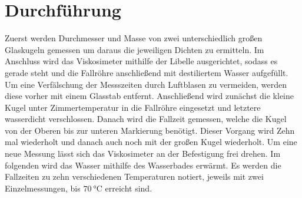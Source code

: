 
\section{Durchführung}
\label{sec:Durchführung}
Zuerst werden Durchmesser und Masse von zwei unterschiedlich großen Glaskugeln
gemessen um daraus die jeweiligen Dichten zu ermitteln. Im Anschluss wird das
Viskosimeter mithilfe der Libelle ausgerichtet, sodass es gerade steht und die Fallröhre anschließend
mit destiliertem Wasser aufgefüllt. Um eine Verfälschung der Messszeiten durch
Luftblasen zu vermeiden, werden diese vorher mit einem Glasstab entfernt.
Anschließend wird zunächst die kleine Kugel unter Zimmertemperatur in die
Fallröhre eingesetzt und letztere wasserdicht verschlossen. Danach wird die Fallzeit
gemessen, welche die Kugel von der Oberen bis zur unteren Markierung benötigt.
Dieser Vorgang wird Zehn mal wiederholt und danach auch noch mit der großen Kugel
wiederholt. Um eine neue Messung lässt sich das Viskosimeter an der Befestigung
frei drehen. Im folgenden wird das Wasser mithilfe des Wasserbades erwärmt. Es
werden die Fallzeiten zu zehn verschiedenen Temperaturen notiert, jeweils mit
zwei Einzelmessungen, bis $\SI{70}{\degreeCelsius}$ erreicht sind.
